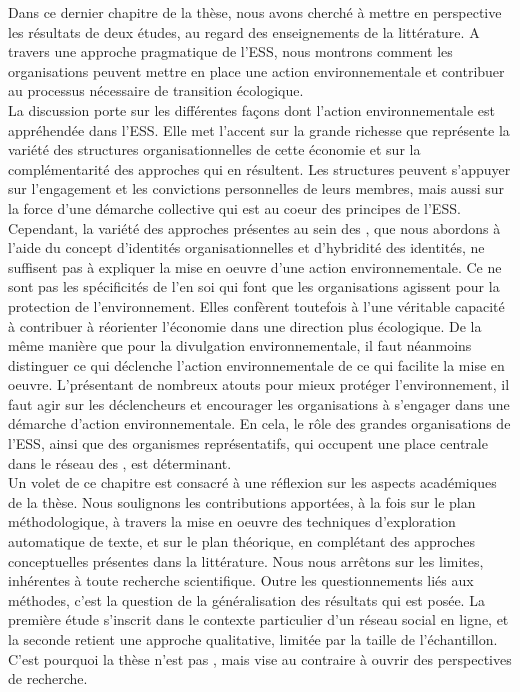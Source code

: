 Dans ce dernier chapitre de la thèse, nous avons cherché à mettre en perspective les résultats de deux études, au regard des enseignements de la littérature. A travers une approche pragmatique de l'ESS, nous montrons comment les organisations peuvent mettre en place une action environnementale et contribuer au processus nécessaire de transition écologique. \\

La discussion porte sur les différentes façons dont l'action environnementale est appréhendée dans l'ESS. Elle met l'accent sur la grande richesse que représente la variété des structures organisationnelles de cette économie et sur la complémentarité des approches qui en résultent. Les structures peuvent s'appuyer sur l'engagement et les convictions personnelles de leurs membres, mais aussi sur la force d'une démarche collective qui est au coeur des principes de l'ESS. \\

Cependant, la variété des approches présentes au sein des \oess, que nous abordons à l'aide du concept d'identités organisationnelles et d'hybridité des identités, ne suffisent pas à expliquer la mise en oeuvre d'une action environnementale. Ce ne sont pas les spécificités de l'\ess en soi qui font que les organisations agissent pour la protection de l'environnement. Elles confèrent toutefois à l'\ess une véritable capacité à contribuer à réorienter l'économie dans une direction plus écologique. De la même manière que pour la divulgation environnementale, il faut néanmoins distinguer ce qui déclenche l'action environnementale de ce qui facilite la mise en oeuvre. L'\ess présentant de nombreux atouts pour mieux protéger l'environnement, il faut agir sur les déclencheurs et encourager les organisations à s'engager dans une démarche d'action environnementale. En cela, le rôle des grandes organisations de l'ESS, ainsi que des organismes représentatifs, qui occupent une place centrale dans le réseau des \eess, est déterminant. \\

Un volet de ce chapitre est consacré à une réflexion sur les aspects académiques de la thèse. Nous soulignons les contributions apportées, à la fois sur le plan méthodologique, à travers la mise en oeuvre des techniques d'exploration automatique de texte, et sur le plan théorique, en complétant des approches conceptuelles présentes dans la littérature. Nous nous arrêtons sur les limites, inhérentes à toute recherche scientifique. Outre les questionnements liés aux méthodes, c'est la question de la généralisation des résultats qui est posée. La première étude s'inscrit dans le contexte particulier d'un réseau social en ligne, et la seconde retient une approche qualitative, limitée par la taille de l'échantillon. C'est pourquoi la thèse n'est pas , mais vise au contraire à ouvrir des perspectives de recherche. \\

